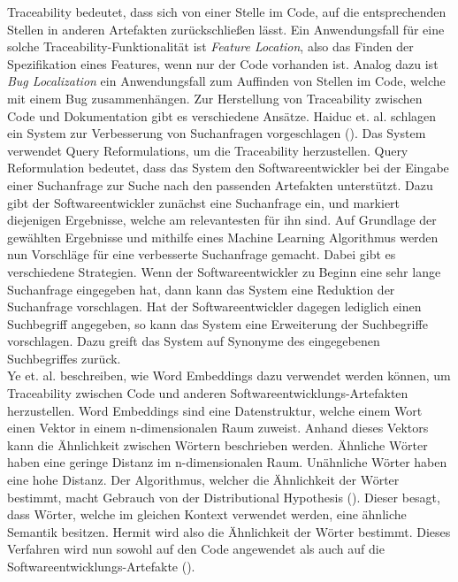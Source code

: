 Traceability bedeutet, dass sich von einer Stelle im Code, auf die entsprechenden Stellen in anderen Artefakten zurückschließen lässt.
Ein Anwendungsfall für eine solche Traceability-Funktionalität ist \textit{Feature Location}, also das Finden der Spezifikation eines Features, wenn nur der Code vorhanden ist.
Analog dazu ist \textit{Bug Localization} ein Anwendungsfall zum Auffinden von Stellen im Code, welche mit einem Bug zusammenhängen.
Zur Herstellung von Traceability zwischen Code und Dokumentation gibt es verschiedene Ansätze.
Haiduc et. al. schlagen ein System zur Verbesserung von Suchanfragen vorgeschlagen (\cite{Haiduc_Bavota_Marcus_Oliveto_DeLucia_Menzies_2013}).
Das System verwendet Query Reformulations, um die Traceability herzustellen.
Query Reformulation bedeutet, dass das System den Softwareentwickler bei der Eingabe einer Suchanfrage zur Suche nach den passenden Artefakten unterstützt.
Dazu gibt der Softwareentwickler zunächst eine Suchanfrage ein, und markiert diejenigen Ergebnisse, welche am relevantesten für ihn sind.
Auf Grundlage der gewählten Ergebnisse und mithilfe eines Machine Learning Algorithmus werden nun Vorschläge für eine verbesserte Suchanfrage gemacht.
Dabei gibt es verschiedene Strategien.
Wenn der Softwareentwickler zu Beginn eine sehr lange Suchanfrage eingegeben hat, dann kann das System eine Reduktion der Suchanfrage vorschlagen.
Hat der Softwareentwickler dagegen lediglich einen Suchbegriff angegeben, so kann das System eine Erweiterung der Suchbegriffe vorschlagen.
Dazu greift das System auf Synonyme des eingegebenen Suchbegriffes zurück.\\

Ye et. al. beschreiben, wie Word Embeddings dazu verwendet werden können, um Traceability zwischen Code und anderen Softwareentwicklungs-Artefakten herzustellen.
Word Embeddings sind eine Datenstruktur, welche einem Wort einen Vektor in einem n-dimensionalen Raum zuweist.
Anhand dieses Vektors kann die Ähnlichkeit zwischen Wörtern beschrieben werden.
Ähnliche Wörter haben eine geringe Distanz im n-dimensionalen Raum.
Unähnliche Wörter haben eine hohe Distanz.
Der Algorithmus, welcher die Ähnlichkeit der Wörter bestimmt, macht Gebrauch von der Distributional Hypothesis (\cite{Harris_1954}).
Dieser besagt, dass Wörter, welche im gleichen Kontext verwendet werden, eine ähnliche Semantik besitzen.
Hermit wird also die Ähnlichkeit der Wörter bestimmt.
Dieses Verfahren wird nun sowohl auf den Code angewendet als auch auf die Softwareentwicklungs-Artefakte (\cite{Ye_Shen_Ma_Bunescu_Liu_2016}).\\


